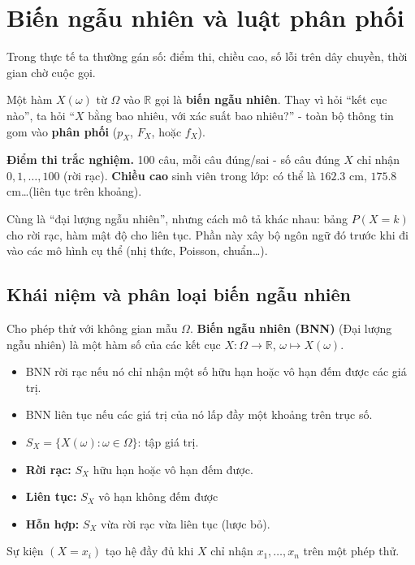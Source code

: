 \documentclass[12pt,a4paper]{article}
\begin{document}

\section{Biến ngẫu nhiên và luật phân phối}

\begin{dongco}
Trong thực tế ta thường gán số: điểm thi, chiều cao, số lỗi trên dây chuyền, thời gian chờ cuộc gọi.

Một hàm $X(\omega)$ từ $\Omega$ vào $\mathbb{R}$ gọi là \textbf{biến ngẫu nhiên}. Thay vì hỏi ``kết cục nào'', ta hỏi ``$X$ bằng bao nhiêu, với xác suất bao nhiêu?'' - toàn bộ thông tin gom vào \textbf{phân phối} ($p_X$, $F_X$, hoặc $f_X$).

\textbf{Điểm thi trắc nghiệm.} 100 câu, mỗi câu đúng/sai - số câu đúng $X$ chỉ nhận $0,1,\ldots,100$ (rời rạc). \textbf{Chiều cao} sinh viên trong lớp: có thể là $162.3$ cm, $175.8$ cm\ldots (liên tục trên khoảng).

Cùng là ``đại lượng ngẫu nhiên'', nhưng cách mô tả khác nhau: bảng $P(X=k)$ cho rời rạc, hàm mật độ cho liên tục. Phần này xây bộ ngôn ngữ đó trước khi đi vào các mô hình cụ thể (nhị thức, Poisson, chuẩn\ldots).
\end{dongco}

\subsection{Khái niệm và phân loại biến ngẫu nhiên}

\begin{dinhnghia}
  Cho phép thử với không gian mẫu $\Omega$. \textbf{Biến ngẫu nhiên (BNN)} (Đại lượng ngẫu nhiên) là một hàm số của các kết cục $X: \Omega \to \mathbb{R}$, $\omega \mapsto X(\omega)$.
  \begin{itemize}
    \item BNN rời rạc nếu nó chỉ nhận một số hữu hạn hoặc vô hạn đếm được các giá trị.
    \item BNN liên tục nếu các giá trị của nó lấp đầy một khoảng trên trục số.
    \item $S_X = \{X(\omega) : \omega \in \Omega\}$: tập giá trị.
    \item \textbf{Rời rạc:} $S_X$ hữu hạn hoặc vô hạn đếm được.
    \item \textbf{Liên tục:} $S_X$ vô hạn không đếm được
    \item \textbf{Hỗn hợp:} $S_X$ vừa rời rạc vừa liên tục (lược bỏ).
  \end{itemize}
  Sự kiện $(X = x_i)$ tạo hệ đầy đủ khi $X$ chỉ nhận $x_1,\ldots,x_n$ trên một phép thử.
\end{dinhnghia}
\end{document}
